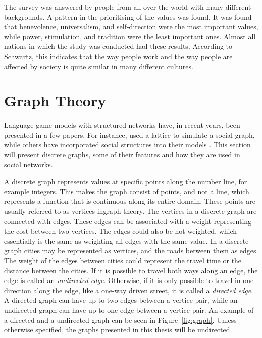 The survey was answered by people from all over the world with many different backgrounds. A pattern in the prioritising of the values was found. It was found that benevolence, universalism, and self-direction were the most important values, while power, stimulation, and tradition were the least important ones. Almost all nations in which the study was conducted had these results. According to Schwartz, this indicates that the way people work and the way people are affected by society is quite similar in many different cultures.


\section{Graph Theory}
Language game models with structured networks have, in recent years, been presented in a few papers. For instance, \citet{lipowska2011naming} used a lattice to simulate a social graph, while others have incorporated social structures into their models \citep{lekvam2014co, gong2004computational}. This section will present discrete graphs, some of their features and how they are used in social networks.

A discrete graph represents values at specific points along the number line, for example integers. This makes the graph consist of points, and not a line, which represents a function that is continuous along its entire domain. These points are usually referred to as vertices ingraph theory. The vertices in a discrete graph are connected with edges. These edges can be associated with a weight representing the cost between two vertices. The edges could also be not weighted, which essentially is the same as weighting all edges with the same value. In a discrete graph cities may be represented as vertices, and the roads between them as edges. The weight of the edges between cities could represent the travel time or the distance between the cities. If it is possible to travel both ways along an edge, the edge is called an \textit{undirected edge}. Otherwise, if it is only possible to travel in one direction along the edge, like a one-way driven street, it is called a \textit{directed edge}. A directed graph can have up to two edges between a vertice pair, while an undirected graph can have up to one edge between a vertice pair. An example of a directed and a undirected graph can be seen in Figure~\ref{fig:graph}. Unless otherwise specified, the graphs presented in this thesis will be undirected.

